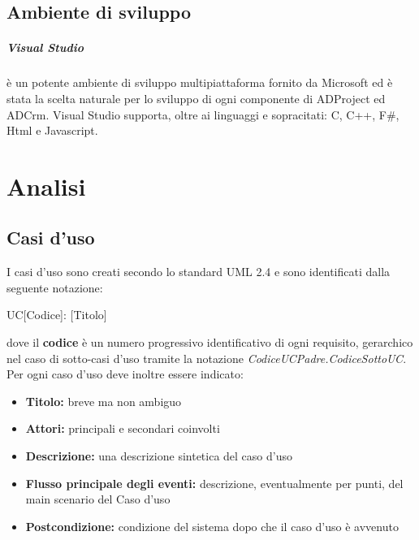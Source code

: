 \documentclass[12pt,a4paper,twoside,openany,english]{book}
\begin{document}
\section{Ambiente di sviluppo}
\paragraph{Visual Studio}
 è un potente ambiente di sviluppo multipiattaforma fornito da Microsoft ed è stata la scelta naturale per lo sviluppo di ogni componente di ADProject ed ADCrm.
Visual Studio supporta, oltre ai linguaggi e  sopracitati: C, C++, F\#, Html e Javascript. 

\chapter{Analisi}\label{analisi}

\section{Casi d'uso}\label{usecase}
I casi d'uso sono creati secondo lo standard UML 2.4 e sono identificati dalla seguente notazione:
\begin{center}
	UC[Codice]: [Titolo]
\end{center}
dove il \textbf{codice} è un numero progressivo identificativo di ogni requisito, gerarchico nel  caso di sotto-casi d'uso tramite la notazione \textit{CodiceUCPadre.CodiceSottoUC}. Per ogni caso d'uso deve inoltre essere indicato:
\begin{itemize}
	\itemsep-0.5em
	\item \textbf{Titolo:} breve ma non ambiguo
	\item \textbf{Attori:} principali e secondari coinvolti
	\item \textbf{Descrizione:} una descrizione sintetica del caso d'uso
	\item \textbf{Flusso principale degli eventi:} descrizione, eventualmente per punti, del main scenario del Caso d'uso
	\item \textbf{Postcondizione:} condizione del sistema dopo che il caso d'uso è avvenuto
\end{itemize}
\begin{small}

\end{small}
\end{document}
